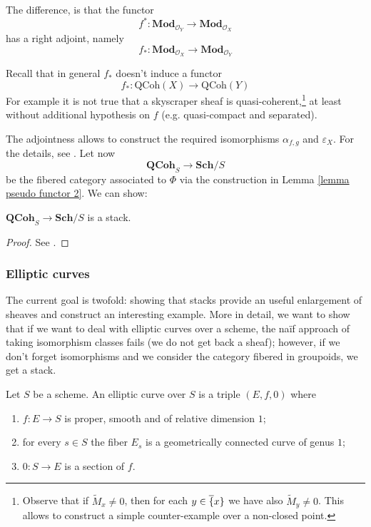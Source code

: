 The difference, is that the functor
\[
f^* \colon \mathbf{Mod}_{\mathcal O_Y} \to \mathbf{Mod}_{\mathcal O_X}
\]
has a right adjoint, namely
\[
f_* \colon \mathbf{Mod}_{\mathcal O_X} \to \mathbf{Mod}_{\mathcal O_Y}
\]

\begin{rmk}
Recall that in general $f_*$ doesn't induce a functor
\[
f_* \colon \mathrm{QCoh}(X) \to \mathrm{QCoh}(Y)
\]
For example it is not true that a skyscraper sheaf is quasi-coherent,\footnote{Observe that if $\widetilde{M}_x \ne 0$, then for each $y \in \overline\{x\}$ we have also $\widetilde{M}_y \ne 0$. This allows to construct a simple counter-example over a non-closed point.} at least without additional hypothesis on $f$ (e.g. quasi-compact and separated).
\end{rmk}

The adjointness allows to construct the required isomorphisms $\alpha_{f,g}$ and $\varepsilon_X$. For the details, see \cite[Ch. 3.2.1]{vistoli}. Let now
\[
\mathbf{QCoh}_S \to \mathbf{Sch}/S
\]
be the fibered category associated to $\Phi$ via the construction in Lemma \ref{lemma pseudo functor 2}. We can show:

\begin{thm}
$\mathbf{QCoh}_S \to \mathbf{Sch}/S$ is a stack.
\end{thm}

\begin{proof}
See \cite[Thm. 4.23]{vistoli}.
\end{proof}

\subsubsection{Elliptic curves}

The current goal is twofold: showing that stacks provide an useful enlargement of sheaves and construct an interesting example. More in detail, we want to show that if we want to deal with elliptic curves over a scheme, the na{\"i}f approach of taking isomorphism classes fails (we do not get back a sheaf); however, if we don't forget isomorphisms and we consider the category fibered in groupoids, we get a stack.

\begin{defin}
Let $S$ be a scheme. An elliptic curve over $S$ is a triple $(E,f,0)$ where
\begin{enumerate}
\item $f \colon E \to S$ is proper, smooth and of relative dimension $1$;
\item for every $s \in S$ the fiber $E_s$ is a geometrically connected curve of genus $1$;
\item $0 \colon S \to E$ is a section of $f$.
\end{enumerate}
\end{defin}

